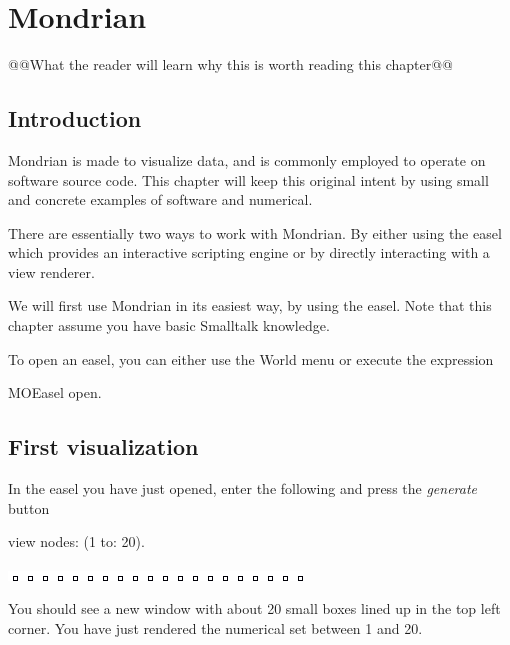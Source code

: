 \documentclass[a4paper,10pt,twoside]{book}
\begin{document}
\fi
\sloppy
\chapter{Mondrian}
\chapterauthor{\authoralex{}}

@@What the reader will learn why this is worth reading this chapter@@


\section{Introduction}
Mondrian is made to visualize data, and is commonly employed to operate on software source code. This chapter will keep this original intent by using small and concrete examples of software and numerical.

There are essentially two ways to work with Mondrian. By either using the easel which provides an interactive scripting engine or by directly interacting with a view renderer. 

We will first use Mondrian in its easiest way, by using the easel. Note that this chapter assume you have basic Smalltalk knowledge.

To open an easel, you can either use the World menu or execute the expression

\begin{code}{}
MOEasel open.
\end{code}

\section{First visualization}
In the easel you have just opened, enter the following and press the \emph{generate} button

\begin{code}{}
view nodes: (1 to: 20).
\end{code}
\begin{center}\includegraphics[scale=0.4]{picture1}\end{center}


You should see a new window with about 20 small boxes lined up in the top left corner. You have just rendered the numerical set between 1 and 20.
\end{document}
